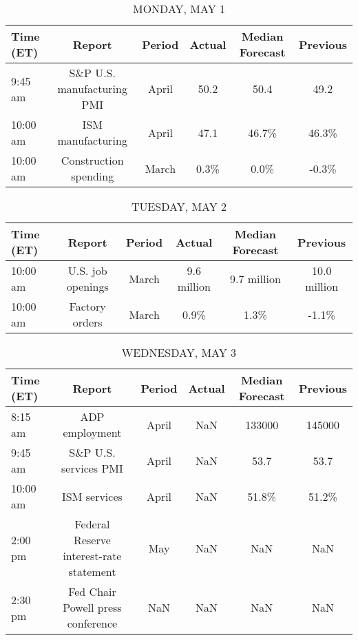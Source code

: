 \documentclass{article}%
\begin{document}
%
\normalsize%


\begin{table}[htbp]%
\caption{MONDAY, MAY 1}%
\centering%
\begin{adjustbox}{width=1\textwidth}%
\begin{tabular}{lccccc}
\toprule
Time (ET) &                     Report & Period & Actual & Median Forecast & Previous \\
\midrule
  9:45 am & S\&P U.S. manufacturing PMI &  April &   50.2 &            50.4 &     49.2 \\
 10:00 am &          ISM manufacturing &  April &   47.1 &           46.7\% &    46.3\% \\
 10:00 am &      Construction spending &  March &   0.3\% &            0.0\% &    -0.3\% \\
\bottomrule
\end{tabular}
%
\end{adjustbox}%
\end{table}

%


\begin{table}[htbp]%
\caption{TUESDAY, MAY 2}%
\centering%
\begin{adjustbox}{width=1\textwidth}%
\begin{tabular}{lccccc}
\toprule
Time (ET) &            Report & Period &      Actual & Median Forecast &     Previous \\
\midrule
 10:00 am & U.S. job openings &  March & 9.6 million &     9.7 million & 10.0 million \\
 10:00 am &    Factory orders &  March &        0.9\% &            1.3\% &        -1.1\% \\
\bottomrule
\end{tabular}
%
\end{adjustbox}%
\end{table}

%


\begin{table}[htbp]%
\caption{WEDNESDAY, MAY 3}%
\centering%
\begin{adjustbox}{width=1\textwidth}%
\begin{tabular}{lccccc}
\toprule
Time (ET) &                                  Report & Period & Actual & Median Forecast & Previous \\
\midrule
  8:15 am &                          ADP employment &  April &    NaN &          133000 &   145000 \\
  9:45 am &                   S\&P U.S. services PMI &  April &    NaN &            53.7 &     53.7 \\
 10:00 am &                            ISM services &  April &    NaN &           51.8\% &    51.2\% \\
  2:00 pm & Federal Reserve interest-rate statement &    May &    NaN &             NaN &      NaN \\
  2:30 pm &       Fed Chair Powell press conference &    NaN &    NaN &             NaN &      NaN \\
\bottomrule
\end{tabular}
%
\end{adjustbox}%
\end{table}
\end{document}
